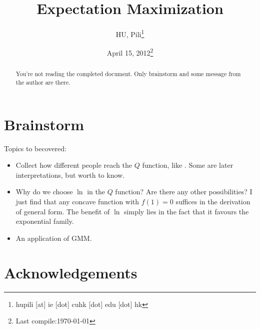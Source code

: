 


\author{HU, Pili\thanks{hupili [at] ie [dot] cuhk [dot] edu [dot] hk}}

\title{Expectation Maximization}
\date{April 15, 2012\thanks{Last compile:\today}}



\maketitle
\begin{abstract}
	You're not reading the completed document. Only 
	brainstorm and some message from the author are there.  
\end{abstract}

\pagebreak
\tableofcontents
\pagebreak



\section{Brainstorm}

Topics to becovered:
\begin{itemize}
	\item Collect how different people reach the $Q$ function, 
		like \cite{dempster1977em}\cite{bishop2006pattern}\cite{borman2004-emtut}. 
		Some are later interpretations, but worth to know. 
	\item Why do we choose $\ln$ in the $Q$ function? 
		Are there any other possibilities? I just find that any 
		concave function with $f(1)=0$ suffices in the derivation of 
		general form. The benefit of $\ln$ simply lies in the fact 
		that it favours the exponential family. 
	\item An application of GMM. 
\end{itemize}






\section*{Acknowledgements}

